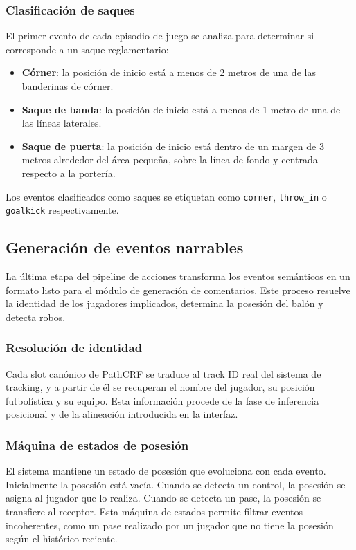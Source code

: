\subsubsection{Clasificación de saques}
El primer evento de cada episodio de juego se analiza para determinar si corresponde a un saque reglamentario:
\begin{itemize}
    \item \textbf{Córner}: la posición de inicio está a menos de 2 metros de una de las banderinas de córner.
    \item \textbf{Saque de banda}: la posición de inicio está a menos de 1 metro de una de las líneas laterales.
    \item \textbf{Saque de puerta}: la posición de inicio está dentro de un margen de 3 metros alrededor del área pequeña, sobre la línea de fondo y centrada respecto a la portería.
\end{itemize}
Los eventos clasificados como saques se etiquetan como \texttt{corner}, \texttt{throw\_in} o \texttt{goalkick} respectivamente.
\subsection{Generación de eventos narrables}
La última etapa del pipeline de acciones transforma los eventos semánticos en un formato listo para el módulo de generación de comentarios. Este proceso resuelve la identidad de los jugadores implicados, determina la posesión del balón y detecta robos.
\subsubsection{Resolución de identidad}
Cada slot canónico de PathCRF se traduce al track ID real del sistema de tracking, y a partir de él se recuperan el nombre del jugador, su posición futbolística y su equipo. Esta información procede de la fase de inferencia posicional y de la alineación introducida en la interfaz.
\subsubsection{Máquina de estados de posesión}
El sistema mantiene un estado de posesión que evoluciona con cada evento. Inicialmente la posesión está vacía. Cuando se detecta un control, la posesión se asigna al jugador que lo realiza. Cuando se detecta un pase, la posesión se transfiere al receptor. Esta máquina de estados permite filtrar eventos incoherentes, como un pase realizado por un jugador que no tiene la posesión según el histórico reciente.
